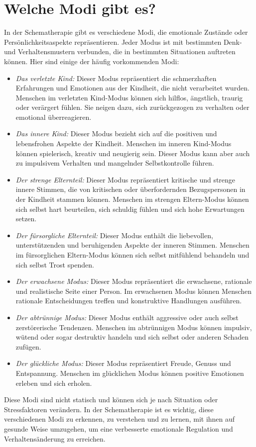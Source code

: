 \section{Welche Modi gibt es?}
In der Schematherapie gibt es verschiedene Modi, die emotionale Zustände oder Persönlichkeitsaspekte repräsentieren. Jeder Modus ist mit bestimmten Denk- und Verhaltensmustern verbunden, die in bestimmten Situationen auftreten können. Hier sind einige der häufig vorkommenden Modi:
\begin{itemize}
    \item \emph{Das verletzte Kind:} Dieser Modus repräsentiert die schmerzhaften Erfahrungen und Emotionen aus der Kindheit, die nicht verarbeitet wurden. Menschen im verletzten Kind-Modus können sich hilflos, ängstlich, traurig oder verärgert fühlen. Sie neigen dazu, sich zurückgezogen zu verhalten oder emotional überreagieren.
    \item \emph{Das innere Kind:} Dieser Modus bezieht sich auf die positiven und lebensfrohen Aspekte der Kindheit. Menschen im inneren Kind-Modus können spielerisch, kreativ und neugierig sein. Dieser Modus kann aber auch zu impulsivem Verhalten und mangelnder Selbstkontrolle führen. 
    \item \emph{Der strenge Elternteil:} Dieser Modus repräsentiert kritische und strenge innere Stimmen, die von kritischen oder überfordernden Bezugspersonen in der Kindheit stammen können. Menschen im strengen Eltern-Modus können sich selbst hart beurteilen, sich schuldig fühlen und sich hohe Erwartungen setzen.
    \item \emph{Der fürsorgliche Elternteil:} Dieser Modus enthält die liebevollen, unterstützenden und beruhigenden Aspekte der inneren Stimmen. Menschen im fürsorglichen Eltern-Modus können sich selbst mitfühlend behandeln und sich selbst Trost spenden.
    \item \emph{Der erwachsene Modus:} Dieser Modus repräsentiert die erwachsene, rationale und realistische Seite einer Person. Im erwachsenen Modus können Menschen rationale Entscheidungen treffen und konstruktive Handlungen ausführen.
    \item \emph{Der abtrünnige Modus:} Dieser Modus enthält aggressive oder auch selbst zerstörerische Tendenzen. Menschen im abtrünnigen Modus können impulsiv, wütend oder sogar destruktiv handeln und sich selbst oder anderen Schaden zufügen.
    \item \emph{Der glückliche Modus:} Dieser Modus repräsentiert Freude, Genuss und Entspannung. Menschen im glücklichen Modus können positive Emotionen erleben und sich erholen.
\end{itemize}
Diese Modi sind nicht statisch und können sich je nach Situation oder Stressfaktoren verändern. In der Schematherapie ist es wichtig, diese verschiedenen Modi zu erkennen, zu verstehen und zu lernen, mit ihnen auf gesunde Weise umzugehen, um eine verbesserte emotionale Regulation und Verhaltensänderung zu erreichen.
